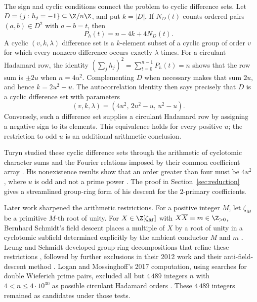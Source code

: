 The sign and cyclic conditions connect the problem to cyclic
difference sets. Let \(D=\{j:h_j=-1\}\subseteq\Z/n\Z\), and put
\(k=|D|\). If \(N_D(t)\) counts ordered pairs \((a,b)\in D^2\) with
\(a-b=t\), then
\[
 P_h(t)=n-4k+4N_D(t).
\]
A cyclic \((v,k,\lambda)\) difference set is a \(k\)-element subset
of a cyclic group of order \(v\) for which every nonzero difference
occurs exactly \(\lambda\) times. For a circulant Hadamard row, the identity
\((\sum_jh_j)^2=\sum_{t=0}^{n-1}P_h(t)=n\) shows that the row sum
is \(\pm2u\) when \(n=4u^2\). Complementing \(D\) when necessary
makes that sum \(2u\), and hence
\(k=2u^2-u\). The autocorrelation identity then says precisely that
\(D\) is a cyclic difference set with parameters
\[
 (v,k,\lambda)=(4u^2,\,2u^2-u,\,u^2-u).
\]
Conversely, such a difference set supplies a circulant Hadamard row
by assigning a negative sign to its elements. This equivalence holds
for every positive \(u\); the restriction to odd \(u\) is an additional
arithmetic conclusion.

Turyn studied these cyclic difference sets through the arithmetic of
cyclotomic character sums and the Fourier relations imposed by their
common coefficient array \cite[pp.~319--323]{Turyn1965}. His
nonexistence results show that an order greater than four must be
\(4u^2\), where \(u\) is odd and not a prime power
\cite[Corollary~2 to Theorem~6, p.~333, and Theorem~8 with its
Corollary, pp.~335--336]{Turyn1965}. The proof in
Section~\ref{sec:reduction} gives a streamlined group-ring form of
his descent for the \(2\)-primary coefficients.

Later work sharpened the arithmetic restrictions. For a positive
integer \(M\), let \(\zeta_M\) be a primitive \(M\)-th root of unity.
For \(X\in\Z[\zeta_M]\) with \(X\overline X=m\in\Z_{>0}\),
Bernhard Schmidt's field descent places a multiple of \(X\) by a root
of unity in a cyclotomic subfield determined explicitly by the ambient
conductor \(M\) and \(m\) \cite{Schmidt1999}. Leung and Schmidt
developed group-ring decompositions that refine these restrictions
\cite{LeungSchmidt2005}, followed by further exclusions in their
2012 work and their anti-field-descent method
\cite{LeungSchmidt2012,LeungSchmidt2016}. Logan and Mossinghoff's
2017 computation, using searches for double Wieferich prime pairs,
excluded all but \(4\,489\) integers \(n\) with
\(4<n\leq4\cdot10^{30}\) as possible circulant Hadamard orders
\cite{LoganMossinghoff2017}. These \(4\,489\) integers remained
as candidates under those tests.

